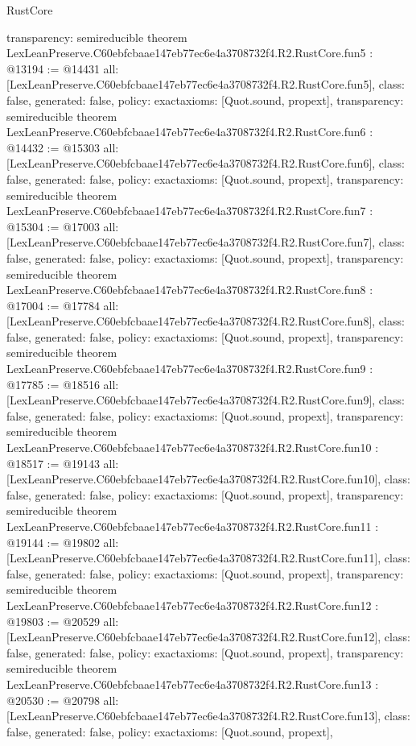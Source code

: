 \begin{lexlean}{RustCore}
\begin{coremodule}
{  transparency: semireducible
}
theorem LexLeanPreserve.C60ebfcbaae147eb77ec6e4a3708732f4.R2.RustCore.fun5 : @13194 := @14431 {
  all: [LexLeanPreserve.C60ebfcbaae147eb77ec6e4a3708732f4.R2.RustCore.fun5],
  class: false,
  generated: false,
  policy: exact{axioms: [Quot.sound, propext]},
  transparency: semireducible
}
theorem LexLeanPreserve.C60ebfcbaae147eb77ec6e4a3708732f4.R2.RustCore.fun6 : @14432 := @15303 {
  all: [LexLeanPreserve.C60ebfcbaae147eb77ec6e4a3708732f4.R2.RustCore.fun6],
  class: false,
  generated: false,
  policy: exact{axioms: [Quot.sound, propext]},
  transparency: semireducible
}
theorem LexLeanPreserve.C60ebfcbaae147eb77ec6e4a3708732f4.R2.RustCore.fun7 : @15304 := @17003 {
  all: [LexLeanPreserve.C60ebfcbaae147eb77ec6e4a3708732f4.R2.RustCore.fun7],
  class: false,
  generated: false,
  policy: exact{axioms: [Quot.sound, propext]},
  transparency: semireducible
}
theorem LexLeanPreserve.C60ebfcbaae147eb77ec6e4a3708732f4.R2.RustCore.fun8 : @17004 := @17784 {
  all: [LexLeanPreserve.C60ebfcbaae147eb77ec6e4a3708732f4.R2.RustCore.fun8],
  class: false,
  generated: false,
  policy: exact{axioms: [Quot.sound, propext]},
  transparency: semireducible
}
theorem LexLeanPreserve.C60ebfcbaae147eb77ec6e4a3708732f4.R2.RustCore.fun9 : @17785 := @18516 {
  all: [LexLeanPreserve.C60ebfcbaae147eb77ec6e4a3708732f4.R2.RustCore.fun9],
  class: false,
  generated: false,
  policy: exact{axioms: [Quot.sound, propext]},
  transparency: semireducible
}
theorem LexLeanPreserve.C60ebfcbaae147eb77ec6e4a3708732f4.R2.RustCore.fun10 : @18517 := @19143 {
  all: [LexLeanPreserve.C60ebfcbaae147eb77ec6e4a3708732f4.R2.RustCore.fun10],
  class: false,
  generated: false,
  policy: exact{axioms: [Quot.sound, propext]},
  transparency: semireducible
}
theorem LexLeanPreserve.C60ebfcbaae147eb77ec6e4a3708732f4.R2.RustCore.fun11 : @19144 := @19802 {
  all: [LexLeanPreserve.C60ebfcbaae147eb77ec6e4a3708732f4.R2.RustCore.fun11],
  class: false,
  generated: false,
  policy: exact{axioms: [Quot.sound, propext]},
  transparency: semireducible
}
theorem LexLeanPreserve.C60ebfcbaae147eb77ec6e4a3708732f4.R2.RustCore.fun12 : @19803 := @20529 {
  all: [LexLeanPreserve.C60ebfcbaae147eb77ec6e4a3708732f4.R2.RustCore.fun12],
  class: false,
  generated: false,
  policy: exact{axioms: [Quot.sound, propext]},
  transparency: semireducible
}
theorem LexLeanPreserve.C60ebfcbaae147eb77ec6e4a3708732f4.R2.RustCore.fun13 : @20530 := @20798 {
  all: [LexLeanPreserve.C60ebfcbaae147eb77ec6e4a3708732f4.R2.RustCore.fun13],
  class: false,
  generated: false,
  policy: exact{axioms: [Quot.sound, propext]},
}
\end{coremodule}
\end{lexlean}
